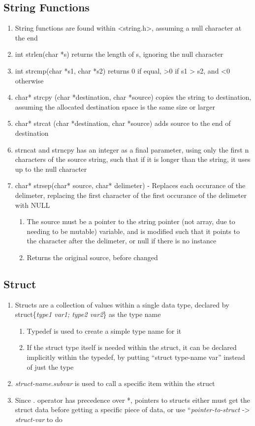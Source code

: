 \documentclass[11 pt, twoside]{article}
\begin{document}
\subsection{String Functions}
\begin{enumerate}
\item String functions are found within <string.h>, assuming a null character at the end
\item int strlen(char *s) returns the length of s, ignoring the null character
\item int strcmp(char *s1, char *s2) returns 0 if equal, >0 if s1 > s2, and <0 otherwise
\item char* strcpy (char *destination, char *source) copies the string to destination, assuming the allocated destination space is the same size or larger
\item char* strcat (char *destination, char *source) adds source to the end of destination
\item strncat and strncpy has an integer as a final parameter, using only the first n characters of the source string, such that if it is longer than the string, it uses up to the null character 
\item char* strsep(char* source, char* delimeter) - Replaces each occurance of the delimeter, replacing the first character of the first occurance of the delimeter with NULL
\begin{enumerate}
\item The source must be a pointer to the string pointer (not array, due to needing to be mutable) variable, and is modified such that it points to the character after the delimeter, or null if there is no instance
\item Returns the original source, before changed
\end{enumerate}
\end{enumerate}

\subsection{Struct}
\begin{enumerate}
\item Structs are a collection of values within a single data type, declared by struct\{\textit{type1 var1; type2 var2}\} as the type name
\begin{enumerate}
\item Typedef is used to create a simple type name for it
\item If the struct type itself is needed within the struct, it can be declared implicitly within the typedef, by putting ``struct type-name var'' instead of just the type
\end{enumerate}
\item \textit{struct-name.subvar} is used to call a specific item within the struct
\item Since . operator has precedence over *, pointers to structs either must get the struct data before getting a specific piece of data, or use ``\textit{pointer-to-struct} -> \textit{struct-var} to do 
\end{enumerate}
\end{document}
